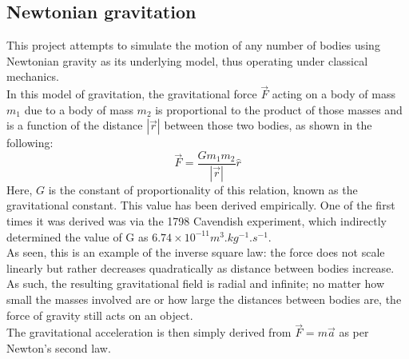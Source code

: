 \documentclass[11pt]{article}
\begin{document}
    \subsection{Newtonian gravitation}\label{subsec:newtonian-gravitation}
    This project attempts to simulate the motion of any number of bodies using Newtonian gravity as its underlying model, thus operating under classical mechanics.\\
    In this model of gravitation, the gravitational force $\vec{F}$ acting on a body of mass $m_1$ due to a body of mass $m_2$ is proportional
    to the product of those masses and is a function of the distance $|\vec{r}|$ between those two bodies, as shown in the following\cite{newton1999principia}:
    \begin{equation}
        \vec{F} = \frac{Gm_{1}m_{2}}{|\vec{r}|}\hat{r}\label{eq:equation1}
    \end{equation}
    Here, $G$ is the constant of proportionality of this relation, known as the gravitational constant.
    This value has been derived empirically.
    One of the first times it was derived was via the 1798 Cavendish experiment, which indirectly determined the value of G as $6.74 \times 10^{-11} \si{m^{3}.kg^{-1}.s^{-1}}$\cite{cavendish}.\\
    As seen, this is an example of the inverse square law: the force does not scale linearly but rather decreases quadratically as distance between bodies increase.
    As such, the resulting gravitational field is radial and infinite;
    no matter how small the masses involved are or how large the distances between bodies are, the force of gravity still acts on an object.\\
    The gravitational acceleration is then simply derived from $\vec{F} = m\vec{a}$ as per Newton's second law.
\end{document}
